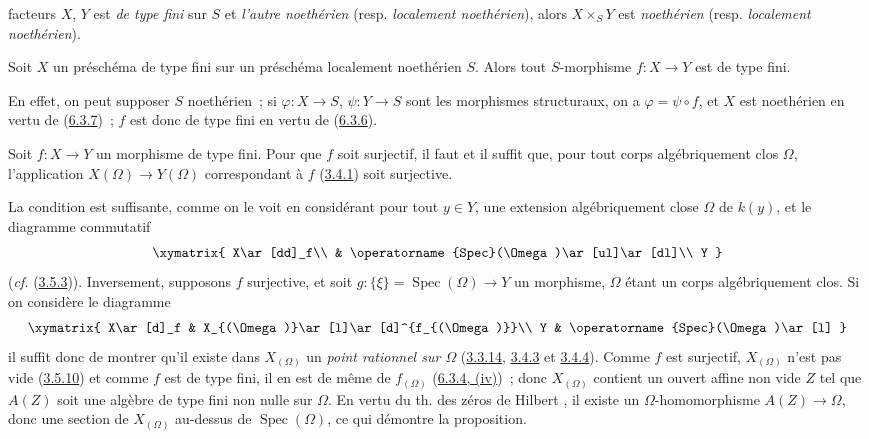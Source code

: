 facteurs $X$, $Y$ est \emph{de type fini} sur $S$ et
\emph{l'autre noethérien} (resp. \emph{localement noethérien}), alors
$X\times_S Y$ est \emph{noethérien} (resp. \emph{localement noethérien}).

\begin{corollary}[6.3.9]
\label{I.6.3.9-fr}
Soit $X$ un préschéma de type fini sur un préschéma localement noethérien $S$.
Alors tout $S$-morphisme $f:X\to Y$ est de type fini.
\end{corollary}

En effet, on peut supposer $S$ noethérien~; si $\varphi:X\to S$,
$\psi:Y\to S$ sont les morphismes structuraux, on a $\varphi=\psi\circ f$, et
$X$ est noethérien en vertu de (\hyperref[I.6.3.7-fr]{6.3.7})~; $f$ est donc
de type fini en vertu de (\hyperref[I.6.3.6-fr]{6.3.6}).

\begin{proposition}[6.3.10]
\label{I.6.3.10-fr}
Soit $f:X\to Y$ un morphisme de type fini. Pour que $f$ soit surjectif, il faut
et il suffit que, pour tout corps algébriquement clos $\Omega$, l'application
$X(\Omega)\to Y(\Omega)$ correspondant à $f$
(\hyperref[I.3.4.1-fr]{3.4.1}) soit surjective.
\end{proposition}

La condition est suffisante, comme on le voit en considérant pour tout
$y\in Y$, une extension algébriquement close $\Omega$ de $k(y)$, et le
diagramme commutatif
\[
  \xymatrix{
    X\ar[dd]_f\\
    & \operatorname{Spec}(\Omega)\ar[ul]\ar[dl]\\
    Y
  }
\]
(\emph{cf.} (\hyperref[I.3.5.3-fr]{3.5.3})). Inversement, supposons $f$
surjective, et soit $g:\{\xi\}=\operatorname{Spec}(\Omega)\to Y$ un morphisme,
$\Omega$ étant un corps algébriquement clos. Si on considère le diagramme
\[
  \xymatrix{
    X\ar[d]_f &
    X_{(\Omega)}\ar[l]\ar[d]^{f_{(\Omega)}}\\
    Y &
    \operatorname{Spec}(\Omega)\ar[l]
  }
\]
il suffit donc de montrer qu'il existe dans $X_{(\Omega)}$ un
\emph{point rationnel sur $\Omega$}
(\hyperref[I.3.3.14-fr]{3.3.14}, \hyperref[I.3.4.3-fr]{3.4.3} et
\hyperref[I.3.4.4-fr]{3.4.4}). Comme $f$ est surjectif, $X_{(\Omega)}$ n'est
pas vide (\hyperref[I.3.5.10-fr]{3.5.10}) et comme $f$ est de type fini, il en
est de même de $f_{(\Omega)}$ (\hyperref[I.6.3.4-fr]{6.3.4, (iv)})~; donc
$X_{(\Omega)}$ contient un ouvert affine non vide $Z$ tel que $A(Z)$ soit une
algèbre de type fini non nulle sur $\Omega$. En vertu du th. des zéros de
Hilbert \cite{I-21}, il existe un $\Omega$-homomorphisme $A(Z)\to\Omega$, donc
une section de $X_{(\Omega)}$ au-dessus de $\operatorname{Spec}(\Omega)$, ce
qui démontre la proposition.

